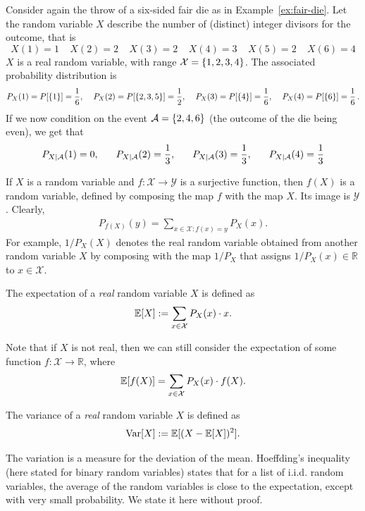 \begin{example}
Consider again the throw of a six-sided fair die as in Example~\ref{ex:fair-die}. Let the random variable $X$ describe the number of (distinct) integer divisors for the outcome, that is
\[X(1) = 1 \ \ \ \ \ X(2) = 2 \ \ \ \ \ X(3) = 2 \ \ \ \ \ X(4) = 3 \ \ \ \ \ X(5) = 2 \ \ \ \ \ X(6) = 4
\]
$X$ is a real random variable, with range $\mathcal{X} = \{1,2,3,4\}$. The associated probability distribution is
\[P_X(1) = P[\{1\}] = \frac{1}{6}, \hspace{4mm} P_X(2) = P[\{2,3,5\}] = \frac{1}{2}, \hspace{4mm} P_X(3) = P[\{4\}] = \frac{1}{6}, \hspace{4mm} P_X(4) = P[\{6\}]=\frac{1}{6} \, .
\]
If we now condition on the event $\mathcal{A} = \{2,4,6\}$ (the outcome of the die being even), we get that
\[P_{X | \mathcal{A}}(1) = 0, \hspace{6mm} P_{X | \mathcal{A}}(2) = \frac{1}{3},  \hspace{6mm} P_{X | \mathcal{A}}(3) = \frac{1}{3},  \hspace{6mm}  P_{X | \mathcal{A}}(4) = \frac{1}{3}
\]
\end{example}
If $X$ is a random variable and $f : \mathcal{X} \to \mathcal{Y}$ is a surjective function, then $f(X)$ is a random variable, defined by composing the map $f$ with the map $X$. Its image is $\mathcal{Y}$. Clearly,
\begin{align}
P_{f(X)}(y) = \sum_{x \in \mathcal{X} : f(x) = y} P_X(x).
\end{align}
For example, $1/P_X(X)$ denotes the real random variable obtained from another random variable $X$ by composing with the map $1/P_X$ that assigns $1/P_X(x) \in \mathbb{R}$ to $x \in \mathcal{X}$.

\begin{definition}[Expectation]
The expectation of a \emph{real} random variable $X$ is defined as
\[
\mathbb{E}[X] := \sum_{x \in \mathcal{X}} P_X(x) \cdot x.
\]
\end{definition}
Note that if $X$ is not real, then we can still consider the expectation of some function $f : \mathcal{X} \to \mathbb{R}$, where
\begin{align}
\mathbb{E}[f(X)] = \sum_{x \in \mathcal{X}} P_X(x) \cdot f(X).
\end{align}
\begin{definition}[Variance]
The variance of a \emph{real} random variable $X$ is defined as
\[
\mathrm{Var}[X] := \mathbb{E}[(X - \mathbb{E}[X])^2].
\]
\end{definition}
The variation is a measure for the deviation of the mean. Hoeffding's inequality (here stated for binary random variables) states that for a list of i.i.d. random variables, the average of the random variables is close to the expectation, except with very small probability. We state it here without proof.

